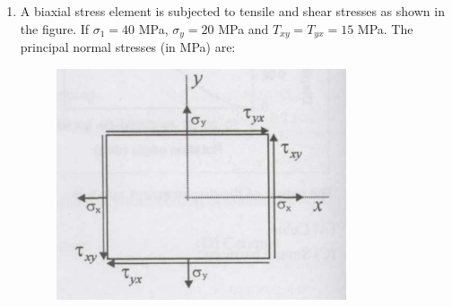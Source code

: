 \documentclass[journal,12pt,onecolumn]{IEEEtran}
\theoremstyle{remark}
\begin{document}
\begin{enumerate}[label=Q.\arabic*]
\item A biaxial stress element is subjected to tensile and shear stresses as shown in the figure. If $\sigma_1 = 40$ MPa, $\sigma_y = 20$ MPa and $T_{xy} = T_{yx} = 15$ MPa. The principal normal stresses (in MPa) are:
\newpage
\begin{figure}[h]
    \centering
    \includegraphics[width=0.5\linewidth]{figs/2.png}
    \label{fig:placeholder}
\end{figure} 


\end{enumerate}
\end{document}
